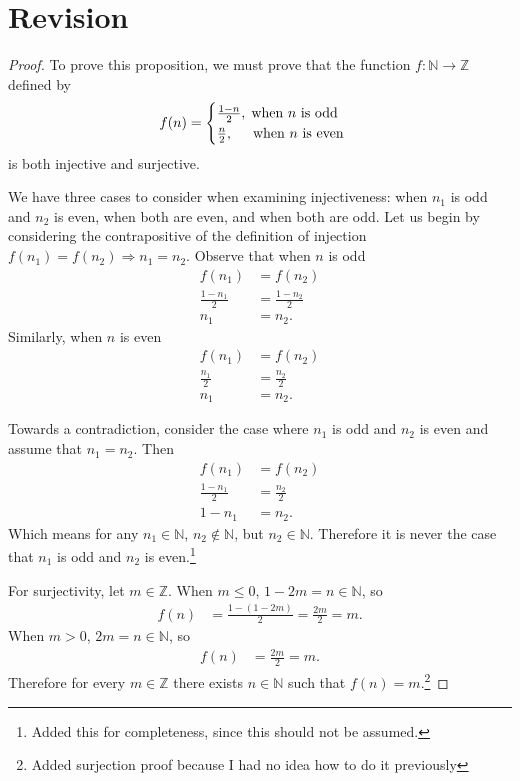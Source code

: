 \documentclass[12pt]{amsart}
\newcommand{\Z}{\mathbb{Z}}
\newcommand{\N}{\mathbb{N}}
\begin{document}
\section{Revision}

\begin{proof}
To prove this proposition, we must prove that the function $f\colon \N\rightarrow\Z$ defined by
\begin{align*}
f(n) =
\begin{cases}
\frac{1-n}{2},\text{\hspace{.1cm}when $n$ is odd}\\
\frac{n}{2},\text{\hspace{.5cm}when $n$ is even}
\end{cases}
\end{align*}
is both injective and surjective.

We have three cases to consider when examining injectiveness: when $n_1$ is odd and $n_2$ is even, when both are even, and when both are odd.  Let us begin by considering the contrapositive of the definition of injection $f(n_1)=f(n_2)\Rightarrow n_1=n_2$.  Observe that when $n$ is odd
\begin{align*}
f(n_1) &= f(n_2)\\
\frac{1-n_1}{2} &= \frac{1-n_2}{2}\\
n_1 &= n_2.
\end{align*}
Similarly, when $n$ is even
\begin{align*}
f(n_1) &= f(n_2)\\
\frac{n_1}{2} &= \frac{n_2}{2}\\
n_1 &= n_2.
\end{align*}

Towards a contradiction, consider the case where $n_1$ is odd and $n_2$ is even and assume that $n_1 = n_2$.  Then 
\begin{align*}
f(n_1) &= f(n_2)\\
\frac{1-n_1}{2} &= \frac{n_2}{2}\\
1-n_1 &= n_2.
\end{align*}
Which means for any $n_1\in\N$, $n_2\notin \N$, but $n_2\in\N$.  Therefore it is never the case that $n_1$ is odd and $n_2$ is even.\footnote{Added this for completeness, since this should not be assumed.}

For surjectivity, let $m\in\Z$.  When $m\leq0$, $1-2m=n\in\N$, so
\begin{align*}
f(n) &= \frac{1-(1-2m)}{2}= \frac{2m}{2}=m.
\end{align*}
When $m>0$, $2m=n\in\N$, so
\begin{align*}
f(n) &= \frac{2m}{2} = m.
\end{align*}
Therefore for every $m\in\Z$ there exists $n\in\N$ such that $f(n)=m$.\footnote{Added surjection proof because I had no idea how to do it previously}
\end{proof}
\end{document}
